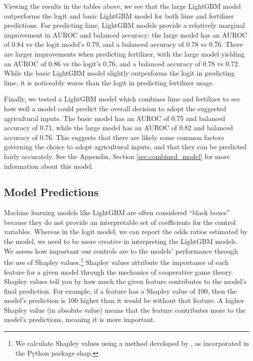 \documentclass[12pt]{article}
\begin{document}



Viewing the results in the tables above, we see that the large LightGBM model outperforms the logit and basic LightGBM model for both lime and fertilizer predictions. For predicting lime, LightGBM models provide a relatively marginal improvement in AUROC and balanced accuracy: the large model has an AUROC of 0.84 vs the logit model's 0.79, and a balanced accuracy of 0.78 vs 0.76. There are larger improvements when predicting fertilizer, with the large model yielding an AUROC of 0.86 vs the logit's 0.76, and a balanced accuracy of 0.78 vs 0.72. While the basic LightGBM model slightly outperforms the logit in predicting lime, it is noticeably worse than the logit in predicting fertilizer usage.

Finally, we tested a LightGBM model which combines lime and fertilizer to see how well a model could predict the overall decision to adopt the suggested agricultural inputs. The basic model has an AUROC of 0.75 and balanced accuracy of 0.71, while the large model has an AUROC of 0.82 and balanced accuracy of 0.76. This suggests that there are likely some common factors governing the choice to adopt agricultural inputs, and that they can be predicted fairly accurately. See the Appendix, Section \ref{sec:combined_model} for more information about this model.

\subsection{Model Predictions}
Machine learning models like LightGBM are often considered ``black boxes'' because they do not provide an interpretable set of coefficients for the control variables. Whereas in the logit model, we can report the odds ratios estimated by the model, we need to be more creative in interpreting the LightGBM models. We assess how important our controls are to the models' performance through the use of Shapley values.\footnote{We calculate Shapley values using a method developed by \textcite{lundberg_unified_2017}, as incorporated in the Python package \textsf{shap}.} Shapley values attribute the importance of each feature for a given model through the mechanics of cooperative game theory. Shapley values tell you by how much the given feature contributes to the model's final prediction. For example, if a feature has a Shapley value of 100, then the model's prediction is 100 higher than it would be without that feature. A higher Shapley value (in absolute value) means that the feature contributes more to the model's predictions, meaning it is more important.
\end{document}
